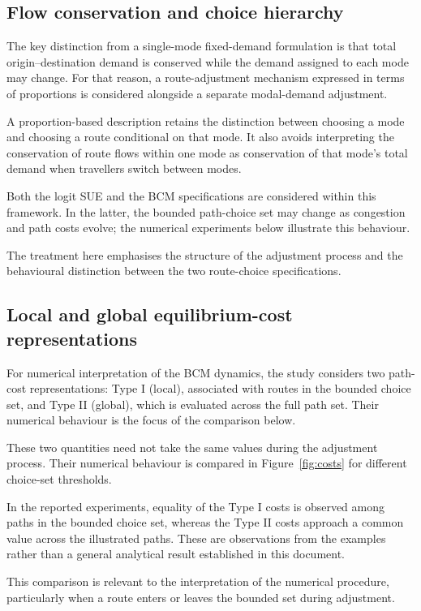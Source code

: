 \documentclass[11pt,a4paper]{article}
\begin{document}
\subsection{Flow conservation and choice hierarchy}

The key distinction from a single-mode fixed-demand formulation is that total origin--destination demand is conserved while the demand assigned to each mode may change. For that reason, a route-adjustment mechanism expressed in terms of proportions is considered alongside a separate modal-demand adjustment.

A proportion-based description retains the distinction between choosing a mode and choosing a route conditional on that mode. It also avoids interpreting the conservation of route flows within one mode as conservation of that mode's total demand when travellers switch between modes.

Both the logit SUE and the BCM specifications are considered within this framework. In the latter, the bounded path-choice set may change as congestion and path costs evolve; the numerical experiments below illustrate this behaviour.

The treatment here emphasises the structure of the adjustment process and the behavioural distinction between the two route-choice specifications.


\subsection{Local and global equilibrium-cost representations}

For numerical interpretation of the BCM dynamics, the study considers two path-cost representations: Type I (local), associated with routes in the bounded choice set, and Type II (global), which is evaluated across the full path set. Their numerical behaviour is the focus of the comparison below.

These two quantities need not take the same values during the adjustment process. Their numerical behaviour is compared in Figure~\ref{fig:costs} for different choice-set thresholds.

In the reported experiments, equality of the Type I costs is observed among paths in the bounded choice set, whereas the Type II costs approach a common value across the illustrated paths. These are observations from the examples rather than a general analytical result established in this document.

This comparison is relevant to the interpretation of the numerical procedure, particularly when a route enters or leaves the bounded set during adjustment.
\end{document}

